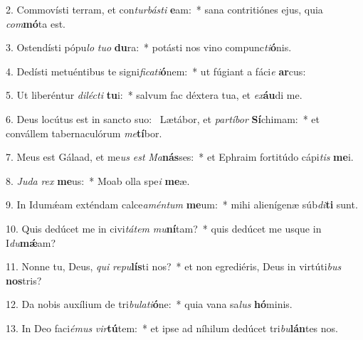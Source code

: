 2. Commovísti terram, et con\textit{tur}\textit{bás}\textit{ti} \textbf{e}am:~*  sana contritiónes ejus, quia \textit{com}\textbf{mó}ta est.\

3. Ostendísti pópu\textit{lo} \textit{tu}\textit{o} \textbf{du}ra:~*  potásti nos vino compunc\textit{ti}\textbf{ó}nis.\

4. Dedísti metuéntibus te signi\textit{fi}\textit{ca}\textit{ti}\textbf{ó}nem:~*  ut fúgiant a fáci\textit{e} \textbf{ar}cus:\

5. Ut liberéntur \textit{di}\textit{léc}\textit{ti} \textbf{tu}i:~*  salvum fac déxtera tua, et \textit{ex}\textbf{áu}di me.\

6. Deus locútus est in sancto suo: \dag\  Lætábor, et \textit{par}\textit{tí}\textit{bor} \textbf{Sí}chimam:~*  et convállem tabernaculórum \textit{me}\textbf{tí}bor.\

7. Meus est Gálaad, et me\textit{us} \textit{est} \textit{Ma}\textbf{nás}ses:~*  et Ephraim fortitúdo cápi\textit{tis} \textbf{me}i.\

8. \textit{Ju}\textit{da} \textit{rex} \textbf{me}us:~*  Moab olla spe\textit{i} \textbf{me}æ.\

9. In Idumǽam exténdam calce\textit{a}\textit{mén}\textit{tum} \textbf{me}um:~*  mihi alienígenæ súb\textit{di}\textbf{ti} sunt.\

10. Quis dedúcet me in civi\textit{tá}\textit{tem} \textit{mu}\textbf{ní}tam?~*  quis dedúcet me usque in I\textit{du}\textbf{mǽ}am?\

11. Nonne tu, Deus, \textit{qui} \textit{re}\textit{pu}\textbf{lís}ti nos?~*  et non egrediéris, Deus in virtúti\textit{bus} \textbf{nos}tris?\

12. Da nobis auxílium de tri\textit{bu}\textit{la}\textit{ti}\textbf{ó}ne:~*  quia vana sa\textit{lus} \textbf{hó}minis.\

13. In Deo faci\textit{é}\textit{mus} \textit{vir}\textbf{tú}tem:~*  et ipse ad níhilum dedúcet tri\textit{bu}\textbf{lán}tes nos.\

